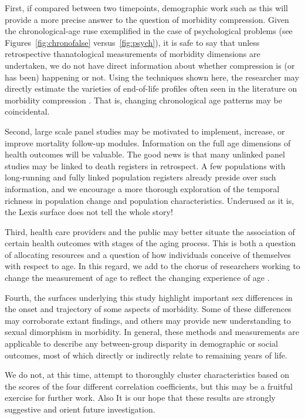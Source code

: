 \documentclass[11pt,oneside]{article} %
\begin{document}
First, if
compared between two timepoints, demographic work such as this will
provide a more precise answer to the question of morbidity compression. Given the chronological-age ruse exemplified in the case of psychological problems (see Figures~\ref{fig:chronofalse} versus~\ref{fig:psych}), it is safe to say that unless retrospective
thanatological measurements of morbidity dimensions are undertaken, we do
not have direct information about whether compression is (or has
been) happening or not. Using the techniques shown here, the researcher may
directly estimate the varieties of end-of-life profiles often seen in the
literature on morbidity compression \citep[e.g.,][]{fries2011compression}.
That is, changing chronological age patterns may be coincidental.

Second, large scale panel studies may be motivated to
implement, increase, or improve mortality follow-up modules. Information
on the full age dimensions of health outcomes will be valuable. The good news is
that many unlinked panel studies may be linked to death registers in
retrospect. A few populations with long-running and fully linked
population registers already preside over such information, and we encourage a
more thorough exploration of the temporal richness in population change and
population characteristics. Underused as it is, the Lexis surface does not tell
the whole story! 

Third, health care providers and the public may better situate the association
of certain health outcomes with stages of the aging process. This is both a
question of allocating resources and a question of how individuals conceive of
themselves with respect to age. In this regard, we add to the chorus of
researchers working to change the measurement of age to reflect the changing
experience of age \citep[see e.g.,][]{sanderson2013characteristics}. 

Fourth,
the surfaces underlying this study highlight important sex differences in the
onset and trajectory of some aspects of morbidity. Some of these differences may
corroborate extant findings, and others may provide new understanding to sexual dimorphism in
morbidity. In general, these methods and measurements are applicable to describe
any between-group disparity in demographic or social outcomes, most of which
directly or indirectly relate to remaining years of life.

We do not, at this time, attempt to thoroughly cluster
characteristics based on the scores of the four different correlation
coefficients, but this may be a fruitful exercise for further work. Also  It is
our hope that these results are strongly suggestive and orient future investigation.
\end{document}
